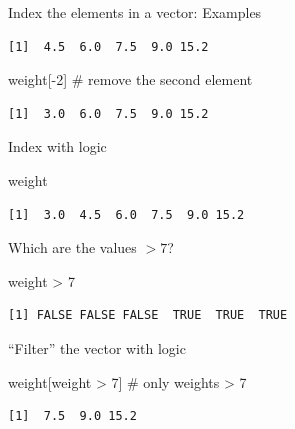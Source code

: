 \documentclass[
  ignorenonframetext,
]{beamer}
\newenvironment{Shaded}{\begin{snugshade}}{\end{snugshade}}
\newcommand{\CommentTok}[1]{\textcolor[rgb]{0.54,0.53,0.53}{#1}}
\newcommand{\DecValTok}[1]{\textcolor[rgb]{0.69,0.50,0.00}{#1}}
\newcommand{\NormalTok}[1]{\textcolor[rgb]{0.12,0.11,0.11}{#1}}
\newcommand{\SpecialCharTok}[1]{\textcolor[rgb]{0.24,0.68,0.91}{#1}}
\begin{document}
\begin{frame}[fragile]{Index the elements in a vector: Examples}
\begin{verbatim}
[1]  4.5  6.0  7.5  9.0 15.2
\end{verbatim}

\begin{Shaded}
\begin{Highlighting}[]
\NormalTok{weight[}\SpecialCharTok{{-}}\DecValTok{2}\NormalTok{]      }\CommentTok{\# remove the second element}
\end{Highlighting}
\end{Shaded}

\begin{verbatim}
[1]  3.0  6.0  7.5  9.0 15.2
\end{verbatim}
\end{frame}

\begin{frame}[fragile]{Index with logic}
\protect\hypertarget{index-with-logic}{}
\begin{Shaded}
\begin{Highlighting}[]
\NormalTok{weight}
\end{Highlighting}
\end{Shaded}

\begin{verbatim}
[1]  3.0  4.5  6.0  7.5  9.0 15.2
\end{verbatim}

\pause

Which are the values \(> 7\)?

\begin{Shaded}
\begin{Highlighting}[]
\NormalTok{weight }\SpecialCharTok{\textgreater{}} \DecValTok{7}
\end{Highlighting}
\end{Shaded}

\begin{verbatim}
[1] FALSE FALSE FALSE  TRUE  TRUE  TRUE
\end{verbatim}

\pause

``Filter'' the vector with logic

\begin{Shaded}
\begin{Highlighting}[]
\NormalTok{weight[weight }\SpecialCharTok{\textgreater{}} \DecValTok{7}\NormalTok{] }\CommentTok{\# only weights \textgreater{} 7}
\end{Highlighting}
\end{Shaded}

\begin{verbatim}
[1]  7.5  9.0 15.2
\end{verbatim}


\end{frame}
\end{document}
